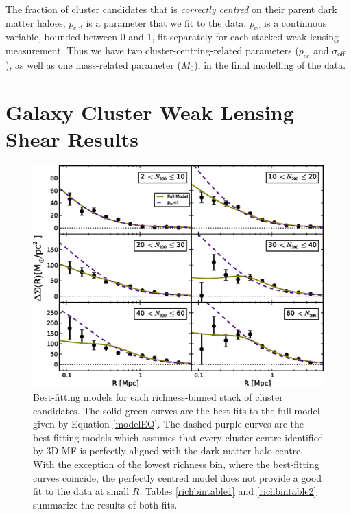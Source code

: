 The fraction of cluster candidates that is {\it correctly centred} on their parent dark matter haloes, $p_{\mathrm{cc}}$, is a parameter that we fit to the data. $p_{\mathrm{cc}}$ is a continuous variable, bounded between 0 and 1, fit separately for each stacked weak lensing measurement. Thus we have two cluster-centring-related parameters ($p_{\mathrm{cc}}$ and $\sigma_{\mathrm{off}}$), as well as one mass-related parameter ($M_0$), in the final modelling of the data.



\section{Galaxy Cluster Weak Lensing Shear Results}
\label{sec:results}

\begin{figure}
\begin{center}
  \includegraphics[scale=0.9]{plots_ch4/shearFit_panel_fcc0and1_slopeMN1p5_DuttonMaccio.eps}
  \caption[Shear for Richness-Binned Clusters]{Best-fitting models for each richness-binned stack of cluster candidates. The solid green curves are the best fits to the full model given by Equation \ref{modelEQ}. The dashed purple curves are the best-fitting models which assumes that every cluster centre identified by \ac{3D-MF} is perfectly aligned with the dark matter halo centre. With the exception of the lowest richness bin, where the best-fitting curves coincide, the perfectly centred model does not provide a good fit to the data at small $R$. Tables \ref{richbintable1} and \ref{richbintable2} summarize the results of both fits.}
\label{plot:nbinned}
\end{center}
\end{figure}

